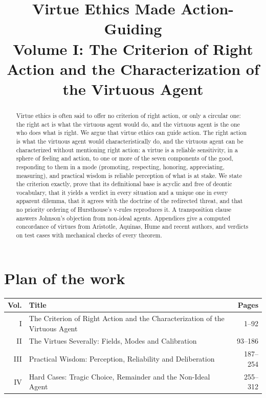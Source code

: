 \documentclass{situationist-preprint}
\title{Virtue Ethics Made Action-Guiding\\[0.4em]\large Volume I: The Criterion of Right Action and the Characterization of the Virtuous Agent}
\begin{document}
\maketitle

\begin{abstract}
Virtue ethics is often said to offer no criterion of right action, or only a circular one: the right act is what the virtuous agent would do, and the virtuous agent is the one who does what is right. We argue that virtue ethics can guide action. The right action is what the virtuous agent would characteristically do, and the virtuous agent can be characterized without mentioning right action: a virtue is a reliable sensitivity, in a sphere of feeling and action, to one or more of the seven components of the good, responding to them in a mode (promoting, respecting, honoring, appreciating, measuring), and practical wisdom is reliable perception of what is at stake. We state the criterion exactly, prove that its definitional base is acyclic and free of deontic vocabulary, that it yields a verdict in every situation and a unique one in every apparent dilemma, that it agrees with the doctrine of the redirected threat, and that no priority ordering of Hursthouse's v-rules reproduces it. A transposition clause answers Johnson's objection from non-ideal agents. Appendices give a computed concordance of \stnconc{} virtues from Aristotle, Aquinas, Hume and recent authors, and verdicts on \stncases{} test cases with mechanical checks of every theorem.
\end{abstract}

\section*{Plan of the work}

\begin{center}\small
\begin{tabular}{@{}rp{}r@{}}
\toprule
Vol. & Title & Pages \\
\midrule
I & The Criterion of Right Action and the Characterization of the Virtuous Agent & 1--92 \\
II & The Virtues Severally: Fields, Modes and Calibration & 93--186 \\
III & Practical Wisdom: Perception, Reliability and Deliberation & 187--254 \\
IV & Hard Cases: Tragic Choice, Remainder and the Non-Ideal Agent & 255--312 \\
\bottomrule
\end{tabular}
\end{center}
\end{document}
